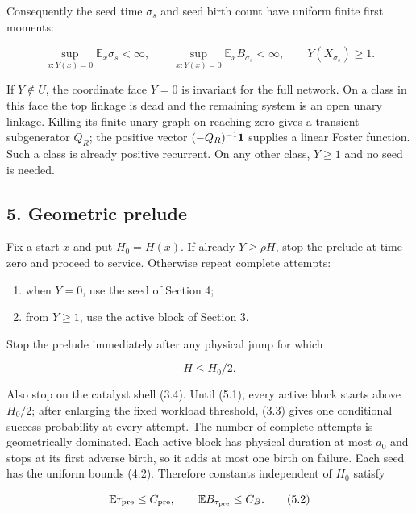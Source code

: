 Consequently the seed time \(\sigma_s\) and seed birth count have
uniform finite first moments:

\[
       \sup_{x:Y(x)=0}\mathbb E_x\sigma_s<\infty,
       \qquad
       \sup_{x:Y(x)=0}\mathbb E_xB_{\sigma_s}<\infty,
       \qquad Y(X_{\sigma_s})\ge1.                    \tag{4.2}
\]

If \(Y\notin U\), the coordinate face \(Y=0\) is invariant for the full
network. On a class in this face the top linkage is dead and the
remaining system is an open unary linkage. Killing its finite unary
graph on reaching zero gives a transient subgenerator \(Q_R\); the
positive vector \((-Q_R)^{-1}{\bf1}\) supplies a linear Foster function.
Such a class is already positive recurrent. On any other class,
\(Y\ge1\) and no seed is needed.

\subsection{5. Geometric prelude}

Fix a start \(x\) and put \(H_0=H(x)\). If already \(Y\ge\rho H\), stop
the prelude at time zero and proceed to service. Otherwise repeat
complete attempts:

\begin{enumerate}
\def\labelenumi{\arabic{enumi}.}
\tightlist
\item
  when \(Y=0\), use the seed of Section 4;
\item
  from \(Y\ge1\), use the active block of Section 3.
\end{enumerate}

Stop the prelude immediately after any physical jump for which

\[
                              H\le H_0/2.              \tag{5.1}
\]

Also stop on the catalyst shell (3.4). Until (5.1), every active block
starts above \(H_0/2\); after enlarging the fixed workload threshold,
(3.3) gives one conditional success probability at every attempt. The
number of complete attempts is geometrically dominated. Each active
block has physical duration at most \(a_0\) and stops at its first
adverse birth, so it adds at most one birth on failure. Each seed has
the uniform bounds (4.2). Therefore constants independent of \(H_0\)
satisfy

\[
             \mathbb E\tau_{\rm pre}\le C_{\rm pre},
             \qquad
             \mathbb E B_{\tau_{\rm pre}}\le C_B.     \tag{5.2}
\]

